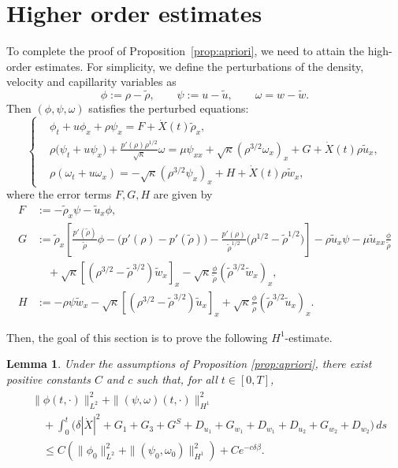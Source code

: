 \documentclass[11pt,reqno]{amsart}
\newtheorem{lemma}{Lemma}[section]
\numberwithin{equation}{section} %
\begin{document}
\section{Higher order estimates} \label{sec:higher_order}
To complete the proof of Proposition~\ref{prop:apriori}, we need to attain the high-order estimates. For simplicity, we define the perturbations of the density, velocity and capillarity variables as
$$\phi:=\rho-\tilde{\rho},\qquad\psi:=u-\tilde{u},\qquad\omega=w-\tilde{w}.$$
Then $(\phi, \psi, \omega)$ satisfies the perturbed equations:
\begin{equation}\label{eq:perturbed-eq}
\left\{
\begin{aligned}
&\phi_t +u \phi_x +\rho \psi_x = F+\dot{X}(t) \tilde{\rho}_x,\\
&\rho\bigl(\psi_t+u \psi_x\bigr)+\frac{p'(\rho)\rho^{1/2}}{\sqrt{\kappa}}\omega =\mu \psi_{xx}+\sqrt{\kappa} (\rho^{3/2}\omega_x)_x +G+\dot{X}(t) \rho \tilde{u}_x,\\
&\rho(\omega_t +u \omega_x) = -\sqrt{\kappa} (\rho^{3/2}\psi_x)_x+ H+ \dot{X}(t) \rho \tilde{w}_x,
\end{aligned}
\right.
\end{equation}
where the error terms $F, G, H$ are given by
\begin{equation*}%
\begin{aligned}
F&:= -\tilde{\rho}_x \psi-\tilde{u}_x \phi,\\
G&:= \tilde{\rho}_x \left[ \frac{p'(\tilde{\rho})}{\tilde{\rho}} \phi -\bigl(p'(\rho)-p'(\tilde{\rho})\bigr)  - \frac{p'(\rho)}{\tilde{\rho}^{1/2}} \bigl( \rho^{1/2} -\tilde{\rho}^{1/2} \bigr) \right]-\rho \tilde{u}_x \psi -\mu \tilde{u}_{xx} \frac{\phi}{\tilde{\rho}} \\
&\quad + \sqrt{\kappa}\left[ (\rho^{3/2}-\tilde{\rho}^{3/2})\tilde{w}_x \right]_x - \sqrt{\kappa}\frac{\phi}{\tilde{\rho}}(\tilde{\rho}^{3/2} \tilde{w}_x)_x, \\
H&:= -\rho \psi \tilde{w}_x - \sqrt{\kappa}\left[ (\rho^{3/2}-\tilde{\rho}^{3/2})\tilde{u}_x \right]_x + \sqrt{\kappa}\frac{\phi}{\tilde{\rho}}(\tilde{\rho}^{3/2} \tilde{u}_x)_x.
\end{aligned}
\end{equation*}

Then, the goal of this section is to prove the following $H^1$-estimate.

\begin{lemma}\label{lem:H1}
	Under the assumptions of Proposition \ref{prop:apriori}, there exist positive constants $C$ and $c$ such that, for all $t \in [0,T]$,
	\begin{align}
		\begin{aligned}\label{est:H1}
		&\|\phi(t,\cdot)\|_{L^2}^2+\|(\psi,\omega)(t,\cdot)\|_{H^1}^2 \\
		&\quad +\int_0^t \bigl(\delta|\dot{X}|^2+G_1+G_3+G^S+D_{u_1}+G_{w_1}+D_{w_1}+D_{u_2}+G_{w_2}+D_{w_2}\bigr)\,ds\\
		&\quad \le C\left(\|\phi_0\|_{L^2}^2+\|(\psi_0,\omega_0)\|_{H^1}^2\right)+C e^{-c \delta\beta}.
		\end{aligned}
	\end{align}
\end{lemma}
\end{document}
